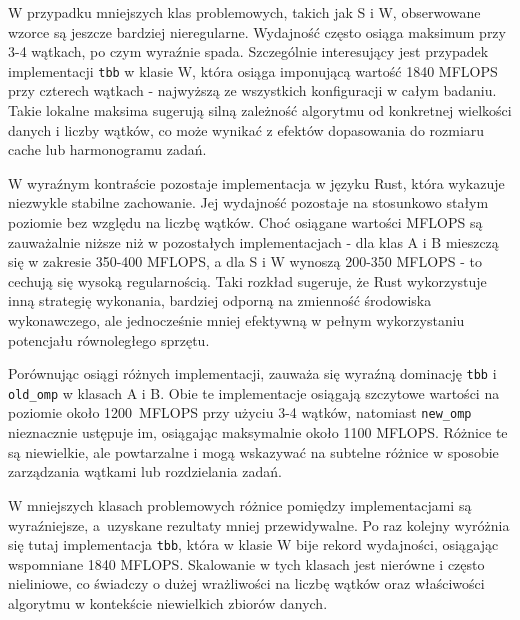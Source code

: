 W przypadku mniejszych klas problemowych, takich jak S i W, obserwowane wzorce są jeszcze bardziej nieregularne. Wydajność często osiąga maksimum przy 3-4 wątkach, po czym wyraźnie spada. Szczególnie interesujący jest przypadek implementacji \texttt{tbb} w klasie W, która osiąga imponującą wartość 1840 MFLOPS przy czterech wątkach - najwyższą ze wszystkich konfiguracji w całym badaniu. Takie lokalne maksima sugerują silną zależność algorytmu od konkretnej wielkości danych i liczby wątków, co może wynikać z efektów dopasowania do rozmiaru cache lub harmonogramu zadań.

W wyraźnym kontraście pozostaje implementacja w języku Rust, która wykazuje niezwykle stabilne zachowanie. Jej wydajność pozostaje na stosunkowo stałym poziomie bez względu na liczbę wątków. Choć osiągane wartości MFLOPS są zauważalnie niższe niż w pozostałych implementacjach - dla klas A i B mieszczą się w zakresie 350-400 MFLOPS, a dla S i W wynoszą 200-350 MFLOPS - to cechują się wysoką regularnością. Taki rozkład sugeruje, że Rust wykorzystuje inną strategię wykonania, bardziej odporną na zmienność środowiska wykonawczego, ale jednocześnie mniej efektywną w pełnym wykorzystaniu potencjału równoległego sprzętu.

Porównując osiągi różnych implementacji, zauważa się wyraźną dominację \texttt{tbb} i \texttt{old\_omp} w klasach A i B. Obie te implementacje osiągają szczytowe wartości na poziomie około \mbox{1200 MFLOPS} przy użyciu 3-4 wątków, natomiast \texttt{new\_omp} nieznacznie ustępuje im, osiągając maksymalnie około 1100 MFLOPS. Różnice te są niewielkie, ale powtarzalne i mogą wskazywać na subtelne różnice w sposobie zarządzania wątkami lub rozdzielania zadań.

W mniejszych klasach problemowych różnice pomiędzy implementacjami są wyraźniejsze, a~uzyskane rezultaty mniej przewidywalne. Po raz kolejny wyróżnia się tutaj implementacja \texttt{tbb}, która w klasie W bije rekord wydajności, osiągając wspomniane 1840 MFLOPS. Skalowanie w tych klasach jest nierówne i często nieliniowe, co świadczy o dużej wrażliwości na liczbę wątków oraz właściwości algorytmu w kontekście niewielkich zbiorów danych.

